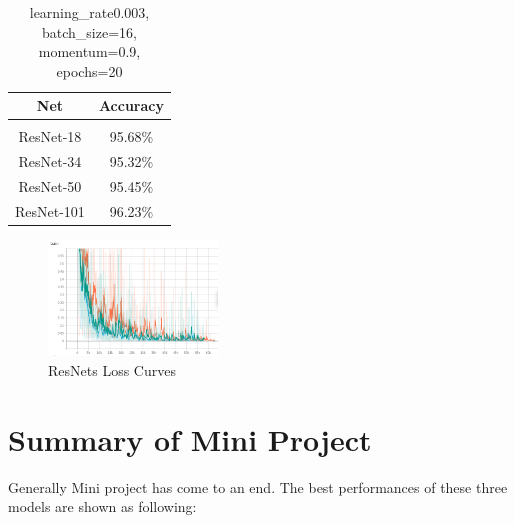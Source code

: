 \documentclass{article} %
\begin{document}
\begin{itemize}
\begin{table}[h]
\caption{learning\_rate0.003, batch\_size=16, momentum=0.9, epochs=20}
\begin{center}
\begin{tabular}{c|c}
\multicolumn{1}{c}{\bf Net} &\multicolumn{1}{c}{\bf Accuracy}
\\ \hline \\
ResNet-18 & 95.68\% \\
ResNet-34 & 95.32\% \\
ResNet-50 & 95.45\% \\
ResNet-101 & 96.23\% \\
\end{tabular}
\end{center}
\end{table}

\begin{figure}[ht]
	\centering
	\includegraphics[width=0.4\textwidth]{5.png}
	\caption{ResNets Loss Curves}
	\label{fig:f2}
\end{figure}

\end{itemize}

\section{Summary of Mini Project}
Generally Mini project has come to an end. The best performances of these three models are shown as following:
\end{document}
